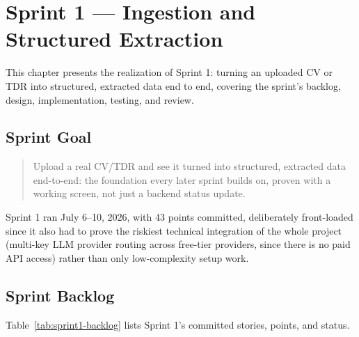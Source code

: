 \chapter{Sprint 1 --- Ingestion and Structured Extraction}
\label{chap:sprint-1}

This chapter presents the realization of Sprint 1: turning an uploaded CV
or TDR into structured, extracted data end to end, covering the sprint's
backlog, design, implementation, testing, and review.

\section{Sprint Goal}

\begin{quote}
Upload a real CV/TDR and see it turned into structured, extracted data
end-to-end: the foundation every later sprint builds on, proven with a
working screen, not just a backend status update.
\end{quote}

Sprint 1 ran July 6--10, 2026, with 43 points committed, deliberately
front-loaded since it also had to prove the riskiest technical
integration of the whole project (multi-key LLM provider routing across
free-tier providers, since there is no paid API access) rather than only
low-complexity setup work.

\section{Sprint Backlog}

Table~\ref{tab:sprint1-backlog} lists Sprint 1's committed stories, points, and status.

